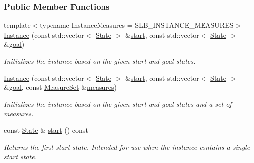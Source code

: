 \subsubsection*{Public Member Functions}
\begin{DoxyCompactItemize}
\item 
{\footnotesize template$<$typename Instance\+Measures  = S\+L\+B\+\_\+\+I\+N\+S\+T\+A\+N\+C\+E\+\_\+\+M\+E\+A\+S\+U\+R\+ES$>$ }\\\hyperlink{structslb_1_1core_1_1sb_1_1Instance_a06868bf762246e7e847cd539b982caa7}{Instance} (const std\+::vector$<$ \hyperlink{structslb_1_1core_1_1sb_1_1Instance_a631205b5ee8d1a61a05c0d30f766ef2e}{State} $>$ \&\hyperlink{structslb_1_1core_1_1sb_1_1Instance_a3a00f96aa0a15f556732befe1eea43ef}{start}, const std\+::vector$<$ \hyperlink{structslb_1_1core_1_1sb_1_1Instance_a631205b5ee8d1a61a05c0d30f766ef2e}{State} $>$ \&\hyperlink{structslb_1_1core_1_1sb_1_1Instance_a8bb2fb56eff2e609fd7929449b141f8d}{goal})
\begin{DoxyCompactList}\small\item\em Initializes the instance based on the given start and goal states. \end{DoxyCompactList}\item 
\hyperlink{structslb_1_1core_1_1sb_1_1Instance_a087f8054483c20ece34433cbba78e2b2}{Instance} (const std\+::vector$<$ \hyperlink{structslb_1_1core_1_1sb_1_1Instance_a631205b5ee8d1a61a05c0d30f766ef2e}{State} $>$ \&\hyperlink{structslb_1_1core_1_1sb_1_1Instance_a3a00f96aa0a15f556732befe1eea43ef}{start}, const std\+::vector$<$ \hyperlink{structslb_1_1core_1_1sb_1_1Instance_a631205b5ee8d1a61a05c0d30f766ef2e}{State} $>$ \&\hyperlink{structslb_1_1core_1_1sb_1_1Instance_a8bb2fb56eff2e609fd7929449b141f8d}{goal}, const \hyperlink{structslb_1_1core_1_1sb_1_1MeasureSet}{Measure\+Set} \&\hyperlink{structslb_1_1core_1_1sb_1_1Instance_ad2e01a665a65c711a952491cf1790d0f}{measures})
\begin{DoxyCompactList}\small\item\em Initializes the instance based on the given start and goal states and a set of measures. \end{DoxyCompactList}\item 
const \hyperlink{structslb_1_1core_1_1sb_1_1Instance_a631205b5ee8d1a61a05c0d30f766ef2e}{State} \& \hyperlink{structslb_1_1core_1_1sb_1_1Instance_a3a00f96aa0a15f556732befe1eea43ef}{start} () const 
\begin{DoxyCompactList}\small\item\em Returns the first start state. Intended for use when the instance contains a single start state. \end{DoxyCompactList}\item 

\end{DoxyCompactItemize}
